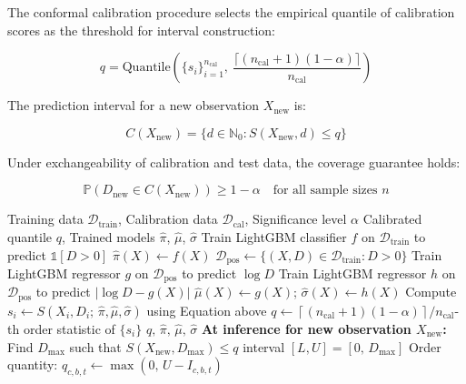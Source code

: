 \documentclass[12pt,a4paper]{article}
\begin{document}
\noindent The conformal calibration procedure selects the empirical quantile of calibration scores as the threshold for interval construction:

\[
q = \text{Quantile}\!\left(\{s_i\}_{i=1}^{n_\text{cal}},\ \frac{\lceil(n_\text{cal}+1)(1-\alpha)\rceil}{n_\text{cal}}\right)
\]

\noindent The prediction interval for a new observation $X_{\text{new}}$ is:

\[
C(X_{\text{new}}) = \{d \in \mathbb{N}_0 : S(X_{\text{new}}, d) \leq q\}
\]

\noindent Under exchangeability of calibration and test data, the coverage guarantee holds:

\[
\mathbb{P}\!\left(D_{\text{new}} \in C(X_{\text{new}})\right) \geq 1 - \alpha \quad \text{for all sample sizes } n
\]

\begin{algorithm}[H]
\caption{ZICP Training, Calibration, and Interval Construction}
\begin{algorithmic}[1]
\Require Training data $\mathcal{D}_\text{train}$, Calibration data $\mathcal{D}_\text{cal}$, Significance level $\alpha$
\Ensure Calibrated quantile $q$, Trained models $\hat{\pi}$, $\hat{\mu}$, $\hat{\sigma}$
\State Train LightGBM classifier $f$ on $\mathcal{D}_\text{train}$ to predict $\mathbb{1}[D > 0]$
\State $\hat{\pi}(X) \leftarrow f(X)$ 
\State $\mathcal{D}_\text{pos} \leftarrow \{(X, D) \in \mathcal{D}_\text{train} : D > 0\}$
\State Train LightGBM regressor $g$ on $\mathcal{D}_\text{pos}$ to predict $\log D$
\State Train LightGBM regressor $h$ on $\mathcal{D}_\text{pos}$ to predict $|\log D - g(X)|$
\State $\hat{\mu}(X) \leftarrow g(X)$; \quad $\hat{\sigma}(X) \leftarrow h(X)$
    \State Compute $s_i \leftarrow S(X_i, D_i;\, \hat{\pi}, \hat{\mu}, \hat{\sigma})$ using Equation above
\EndFor
\State $q \leftarrow \left\lceil(n_\text{cal}+1)(1-\alpha)\right\rceil / n_\text{cal}$-th order statistic of $\{s_i\}$
\State \Return $q,\, \hat{\pi},\, \hat{\mu},\, \hat{\sigma}$
\Statex
\textbf{At inference for new observation $X_\text{new}$:}
\State Find $D_\text{max}$ such that $S(X_\text{new}, D_\text{max}) \leq q$ 
\State \Return interval $[L, U] = [0,\, D_\text{max}]$
\State Order quantity: $q_{c,b,t} \leftarrow \max(0,\, U - I_{c,b,t})$
\end{algorithmic}
\end{algorithm}
\end{document}
